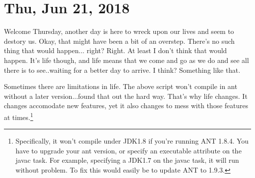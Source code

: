 \section{Thu, Jun 21, 2018}

Welcome Thursday, another day is here to wreck upon our lives and seem to
destory us. Okay, that might have been a bit of an overstep. There's no such
thing that would happen... right? Right. At least I don't think that would
happen. It's life though, and life means that we come and go as we do and see
all there is to see..waiting for a better day to arrive. I think? Something like
that.



Sometimes there are limitations in life. The above script won't compile in ant
without a later version...found that out the hard way. That's why life changes.
It changes accomodate new features, yet it also changes to mess with those
features at times.\footnote{
Specifically, it won't compile under JDK1.8 if you're running ANT 1.8.4. You
have to upgrade your ant version, or specify an executable attribute on the
javac task. For example, specifying a JDK1.7 on the javac task, it will run
without problem. To fix this would easily be to update ANT to 1.9.3.
}